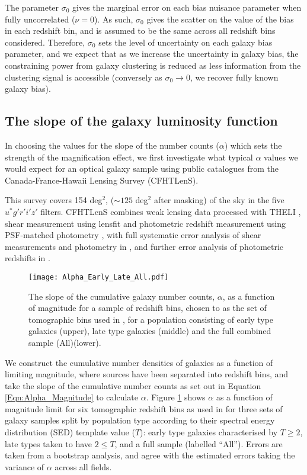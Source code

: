 \documentclass[useAMS,usenatbib,times,letter,amssymb]{mn2e}
\begin{document}
 The parameter $\sigma_0$ gives the marginal error on each bias nuisance parameter when fully uncorrelated ($\nu=0$). As such, $\sigma_0$ gives the scatter on the value of the bias in each redshift bin, and is assumed to be the same across all redshift bins considered. Therefore, $\sigma_0$ sets the level of uncertainty on each galaxy bias parameter, and we expect that as we increase the uncertainty in galaxy bias, the constraining power from galaxy clustering is reduced as less information from the clustering signal is accessible (conversely as $\sigma_0\to 0$, we recover fully known galaxy bias).

\subsection{The slope of the galaxy luminosity function}\label{Sec:CFHT}

In choosing the values for the slope of the number counts ($\alpha$) which sets the strength of the magnification effect, we first investigate what typical $\alpha$ values we would expect for an optical galaxy sample using public catalogues from the Canada-France-Hawaii Lensing Survey (CFHTLenS).

This survey covers 154 deg$^2$, ($\sim125$ deg$^2$ after masking) of the sky in the five $u^*g'r'i'z'$ filters. CFHTLenS combines weak lensing data processed with THELI \citep{Erben:2012p1556}, shear measurement using lensfit \citep{Miller:2013p1648} and photometric redshift measurement using PSF-matched photometry \citep{Hildebrandt:2012p2016}, with full systematic error analysis of shear measurements and photometry in \cite{Heymans:2012p1653}, and further error analysis of photometric redshifts in \cite{Benjamin:2013p2017}. 

\begin{figure}
\centering
\texttt{[image: Alpha\_Early\_Late\_All.pdf]}
\caption{The slope of the cumulative galaxy number counts, $\alpha$,  as a function of magnitude for a sample of redshift bins, chosen to as the set of tomographic bins used in \citet{Heymans:2013p2015}, for a population consisting of early type galaxies (upper), late type galaxies (middle) and the full combined sample (All)(lower). } \label{fig:Alpha_Mag_Redshift}
\end{figure}



We construct the cumulative number densities of galaxies as a function of limiting magnitude, where sources have been separated into redshift bins, and take the slope of the cumulative number counts as set out in Equation \ref{Eqn:Alpha_Magnitude} to calculate $\alpha$.  Figure \ref{fig:Alpha_Mag_Redshift} shows $\alpha$ as a function of magnitude limit for six tomographic redshift bins as used in \cite{Heymans:2013p2015} for three sets of galaxy samples split by population type according to their spectral energy distribution (SED) template value ($T$): early type galaxies characterised by $T\ge2$, late types taken to have $2\le T$, and a full sample (labelled ``All''). Errors are taken from a bootstrap analysis, and agree with the estimated errors taking the variance of $\alpha$ across all fields. 
\end{document}
